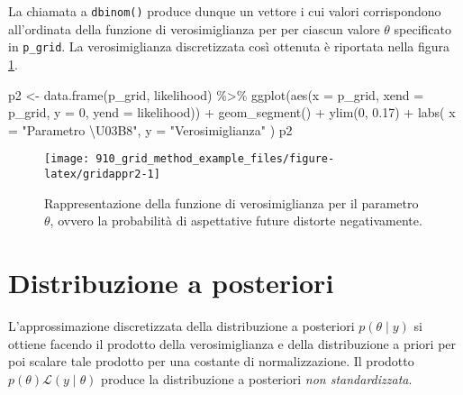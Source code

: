 \documentclass[
]{memoir}
\newenvironment{Shaded}{\begin{snugshade}}{\end{snugshade}}
\newcommand{\AttributeTok}[1]{\textcolor[rgb]{0.77,0.63,0.00}{#1}}
\newcommand{\DecValTok}[1]{\textcolor[rgb]{0.00,0.00,0.81}{#1}}
\newcommand{\FloatTok}[1]{\textcolor[rgb]{0.00,0.00,0.81}{#1}}
\newcommand{\FunctionTok}[1]{\textcolor[rgb]{0.00,0.00,0.00}{#1}}
\newcommand{\NormalTok}[1]{#1}
\newcommand{\OtherTok}[1]{\textcolor[rgb]{0.56,0.35,0.01}{#1}}
\newcommand{\SpecialCharTok}[1]{\textcolor[rgb]{0.00,0.00,0.00}{#1}}
\newcommand{\StringTok}[1]{\textcolor[rgb]{0.31,0.60,0.02}{#1}}
\begin{document}
La chiamata a \texttt{dbinom()} produce dunque un vettore i cui valori corrispondono all'ordinata della funzione di verosimiglianza per per ciascun valore \(\theta\) specificato in \texttt{p\_grid}. La verosimiglianza discretizzata così ottenuta è riportata nella figura \ref{fig:gridappr2}.

\begin{Shaded}
\begin{Highlighting}[]
\NormalTok{p2 }\OtherTok{\textless{}{-}} \FunctionTok{data.frame}\NormalTok{(p\_grid, likelihood) }\SpecialCharTok{\%\textgreater{}\%}
  \FunctionTok{ggplot}\NormalTok{(}\FunctionTok{aes}\NormalTok{(}\AttributeTok{x =}\NormalTok{ p\_grid, }\AttributeTok{xend =}\NormalTok{ p\_grid, }\AttributeTok{y =} \DecValTok{0}\NormalTok{, }\AttributeTok{yend =}\NormalTok{ likelihood)) }\SpecialCharTok{+}
  \FunctionTok{geom\_segment}\NormalTok{() }\SpecialCharTok{+}
  \FunctionTok{ylim}\NormalTok{(}\DecValTok{0}\NormalTok{, }\FloatTok{0.17}\NormalTok{) }\SpecialCharTok{+}
  \FunctionTok{labs}\NormalTok{(}
    \AttributeTok{x =} \StringTok{"Parametro \textbackslash{}U03B8"}\NormalTok{,}
    \AttributeTok{y =} \StringTok{"Verosimiglianza"}
\NormalTok{  )}
\NormalTok{p2}
\end{Highlighting}
\end{Shaded}

\begin{figure}

{\centering \texttt{[image: 910\_grid\_method\_example\_files/figure-latex/gridappr2-1]} 

}

\caption{Rappresentazione della funzione di verosimiglianza per il parametro $\theta$, ovvero la probabilità di aspettative future distorte negativamente.}\label{fig:gridappr2}
\end{figure}

\hypertarget{distribuzione-a-posteriori}{%
\section{Distribuzione a posteriori}\label{distribuzione-a-posteriori}}

L'approssimazione discretizzata della distribuzione a posteriori \(p(\theta \mid y)\) si ottiene facendo il prodotto della verosimiglianza e della distribuzione a priori per poi scalare tale prodotto per una costante di normalizzazione. Il prodotto \(p(\theta)\mathcal{L}(y \mid \theta)\) produce la distribuzione a posteriori \emph{non standardizzata}.
\end{document}
